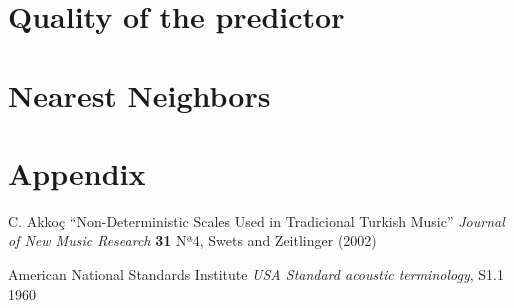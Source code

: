 \documentclass[11pt,a4paper]{article}
\begin{document}
\section{Quality of the predictor}
	
\section{Nearest Neighbors}




\newpage
\appendix
\section{Appendix}


	
\newpage


\begin{thebibliography}{ABC9999}

C. Akkoç
``Non-Deterministic Scales Used in Tradicional Turkish Music''
    \textit{Journal of New Music Research} \textbf{31} Nª4, Swets and Zeitlinger (2002)

American National Standards Institute
	\textit{USA Standard acoustic terminology}, S1.1 1960

\end{thebibliography}
\end{document}
